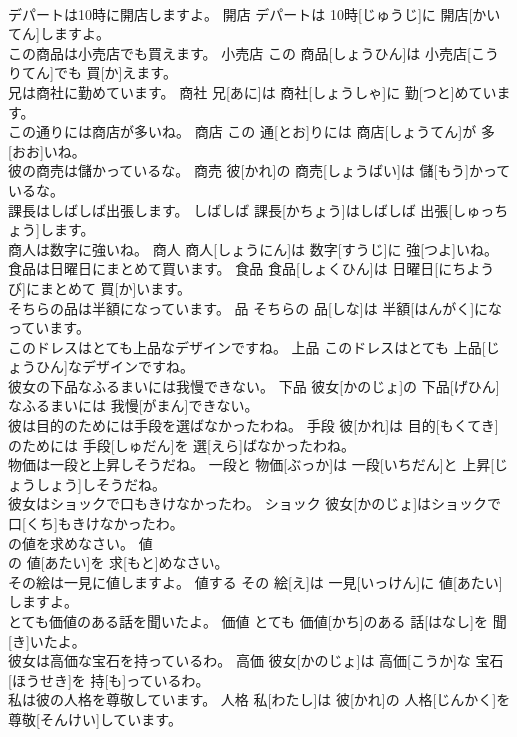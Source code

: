 \documentclass[8pt]{extreport}
\begin{document}
\begin{CJK}{UTF8}{min}
\\	デパートは10時に開店しますよ。	開店	デパートは 10時[じゅうじ]に 開店[かいてん]しますよ。	
\\	この商品は小売店でも買えます。	小売店	この 商品[しょうひん]は 小売店[こうりてん]でも 買[か]えます。	
\\	兄は商社に勤めています。	商社	兄[あに]は 商社[しょうしゃ]に 勤[つと]めています。	
\\	この通りには商店が多いね。	商店	この 通[とお]りには 商店[しょうてん]が 多[おお]いね。	
\\	彼の商売は儲かっているな。	商売	彼[かれ]の 商売[しょうばい]は 儲[もう]かっているな。	
\\	課長はしばしば出張します。	しばしば	課長[かちょう]はしばしば 出張[しゅっちょう]します。	
\\	商人は数字に強いね。	商人	商人[しょうにん]は 数字[すうじ]に 強[つよ]いね。	
\\	食品は日曜日にまとめて買います。	食品	食品[しょくひん]は 日曜日[にちようび]にまとめて 買[か]います。	
\\	そちらの品は半額になっています。	品	そちらの 品[しな]は 半額[はんがく]になっています。	
\\	このドレスはとても上品なデザインですね。	上品	このドレスはとても 上品[じょうひん]なデザインですね。	
\\	彼女の下品なふるまいには我慢できない。	下品	彼女[かのじょ]の 下品[げひん]なふるまいには 我慢[がまん]できない。	
\\	彼は目的のためには手段を選ばなかったわね。	手段	彼[かれ]は 目的[もくてき]のためには 手段[しゅだん]を 選[えら]ばなかったわね。	
\\	物価は一段と上昇しそうだね。	一段と	物価[ぶっか]は 一段[いちだん]と 上昇[じょうしょう]しそうだね。	
\\	彼女はショックで口もきけなかったわ。	ショック	彼女[かのじょ]はショックで 口[くち]もきけなかったわ。	
\\	の値を求めなさい。	値	
\\	[えっくす]の 値[あたい]を 求[もと]めなさい。	
\\	その絵は一見に値しますよ。	値する	その 絵[え]は 一見[いっけん]に 値[あたい]しますよ。	
\\	とても価値のある話を聞いたよ。	価値	とても 価値[かち]のある 話[はなし]を 聞[き]いたよ。	
\\	彼女は高価な宝石を持っているわ。	高価	彼女[かのじょ]は 高価[こうか]な 宝石[ほうせき]を 持[も]っているわ。	
\\	私は彼の人格を尊敬しています。	人格	私[わたし]は 彼[かれ]の 人格[じんかく]を 尊敬[そんけい]しています。	

\end{CJK}
\end{document}
